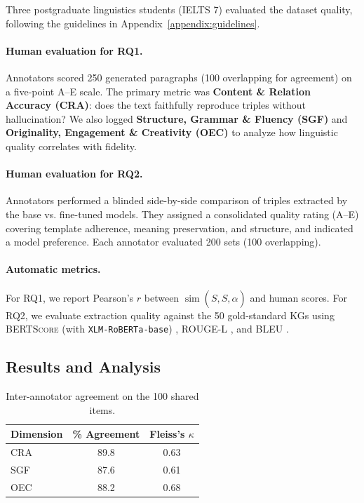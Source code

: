 \documentclass[11pt]{article}
\begin{document}
Three postgraduate linguistics students (IELTS 7) evaluated the dataset quality, following the guidelines in Appendix~\ref{appendix:guidelines}.

\paragraph{Human evaluation for RQ1.}
Annotators scored 250 generated paragraphs (100 overlapping for agreement) on a five-point A–E scale. The primary metric was \textbf{Content \& Relation Accuracy (CRA)}: does the text faithfully reproduce triples without hallucination?
We also logged \textbf{Structure, Grammar \& Fluency (SGF)} and \textbf{Originality, Engagement \& Creativity (OEC)} to analyze how linguistic quality correlates with fidelity.

\paragraph{Human evaluation for RQ2.}
Annotators performed a blinded side-by-side comparison of triples extracted by the base vs. fine-tuned models. They assigned a consolidated quality rating (A–E) covering template adherence, meaning preservation, and structure, and indicated a model preference. Each annotator evaluated 200 sets (100 overlapping).

\paragraph{Automatic metrics.}
For RQ1, we report Pearson’s \(r\) between \(\operatorname{sim}(S,\hat S, \alpha)\) and human scores.
For RQ2, we evaluate extraction quality against the 50 gold-standard KGs using \textsc{BERTScore} (with \texttt{XLM-RoBERTa-base}) \citep{zhang2019bertscore}, ROUGE-L \citep{Lin2004}, and BLEU \citep{Papineni2002}.
\subsection{Results and Analysis}
\label{ssec:results}




\begin{table}[t]
\centering
\small
\begin{tabular}{lcc}
\toprule
\textbf{Dimension} & \% Agreement & Fleiss's \(\kappa\)\\
\midrule
CRA & 89.8 & 0.63\\
SGF & 87.6 & 0.61\\
OEC & 88.2 & 0.68\\
\bottomrule
\end{tabular}
\caption{Inter-annotator agreement on the 100 shared items.}
\label{tab:agreement_tab}
\end{table}
\end{document}
